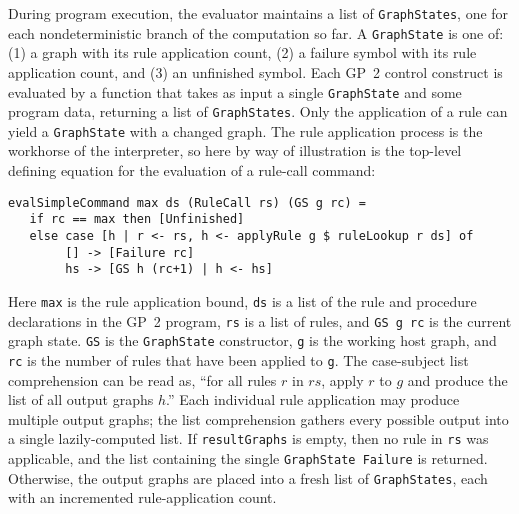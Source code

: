 During program execution, the evaluator maintains a list of \texttt{GraphStates}, one for each nondeterministic branch of the computation so far. A \texttt{GraphState} is one of: (1) a graph with its rule application count, (2) a failure symbol with its rule application count, and (3) an unfinished symbol. Each GP~2 control construct is evaluated by a function that takes as input a single \texttt{GraphState} and some program data, returning a list of \texttt{GraphStates}. Only the application of a rule can yield a \texttt{GraphState} with a changed graph.
The rule application process is the workhorse of the interpreter, so here by way of illustration is the
top-level defining equation for the evaluation of a rule-call command:

\begin{verbatim}
evalSimpleCommand max ds (RuleCall rs) (GS g rc) = 
   if rc == max then [Unfinished]
   else case [h | r <- rs, h <- applyRule g $ ruleLookup r ds] of
        [] -> [Failure rc]
        hs -> [GS h (rc+1) | h <- hs]
\end{verbatim}

Here \texttt{max} is the rule application bound, \texttt{ds} is a list of the rule and procedure declarations in the GP~2 program, \texttt{rs} is a list of rules, and \texttt{GS g rc} is the current graph state. \texttt{GS} is the \texttt{GraphState} constructor, \texttt{g} is the working host graph, and \texttt{rc} is the number of rules that have been applied to \texttt{g}. The case-subject list comprehension can be read as, ``for all rules $r$ in $rs$, apply $r$ to $g$ and produce the list of all output graphs $h$.'' Each individual rule application may produce multiple output graphs; the list comprehension gathers every possible output into a single lazily-computed list. If \texttt{resultGraphs} is empty, then no rule in \texttt{rs} was applicable, and the list containing the single \texttt{GraphState Failure} is returned. Otherwise, the output graphs are placed into a fresh list of \texttt{GraphStates}, each with an incremented rule-application count.

